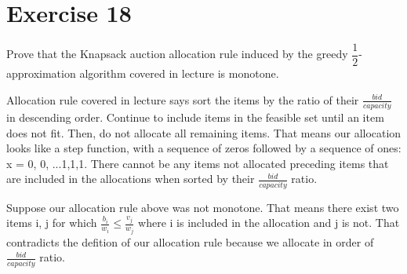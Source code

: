 \documentclass{article}
\begin{document}
\section*{Exercise 18}
Prove that the Knapsack auction allocation rule induced by the greedy
$\dfrac{1}{2}$-approximation algorithm covered in lecture is monotone.

Allocation rule covered in lecture says sort the items by the ratio of their
$\frac{bid}{capacity}$ in descending order.  Continue to include items in the
feasible set until an item does not fit.  Then, do not allocate all remaining
items.  That means our allocation looks like a step function, with a sequence
of zeros followed by a sequence of ones: x = {0, 0, ...1,1,1}.  There cannot
be any items not allocated preceding items that are included in the
allocations when sorted by their $\frac{bid}{capacity}$ ratio.

Suppose our allocation rule above was not monotone.  That means there exist
two items i, j for which $\frac{b_i}{w_i} \leq \frac{v_j}{w_j}$ where i is
included in the allocation and j is not.  That contradicts the defition of our  
allocation rule because we allocate in order of $\frac{bid}{capacity}$ ratio.
\end{document}
